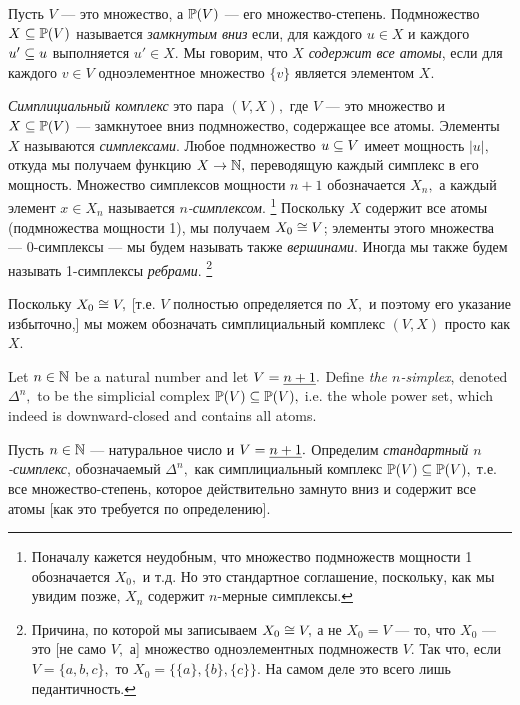 \documentclass[CT4S-EN-RU]{subfiles}
\begin{document}
\begin{definitionRUS}\label{def:simplicial complex}
Пусть $V$ — это множество, а $\PP(V)$ — его множество-степень. Подмножество $X\ss\PP(V)$ называется {\em замкнутым вниз} если, для каждого $u\in X$ и каждого $u'\ss u$ выполняется $u'\in X.$ Мы говорим, что $X$ {\em содержит все атомы}, если для каждого $v\in V$ одноэлементное множество $\{v\}$ является элементом $X.$ 

{\em Симплициальный комплекс} это пара $(V,X),$ где $V$ — это множество и $X\ss\PP(V)$ — замкнутоее вниз подмножество, содержащее все атомы. Элементы $X$ называются {\em симплексами}. Любое подмножество $u\ss V$ имеет мощность $|u|,$ откуда мы получаем функцию $X\to\NN,$ переводящую каждый симплекс в его мощность. Множество симплексов мощности $n+1$ обозначается $X_n,$ а каждый элемент $x\in X_n$ называется {\em $n$-симплексом}.%
\footnote{Поначалу кажется неудобным, что множество подмножеств мощности 1 обозначается $X_0,$ и т.д. Но это стандартное соглашение, поскольку, как мы увидим позже, $X_n$ содержит $n$-мерные симплексы.}
Поскольку $X$ содержит все атомы (подмножества мощности 1), мы получаем $X_0\iso V$; элементы этого множества — 0-симплексы — мы будем называть также {\em вершинами}. Иногда мы также будем называть 1-симплексы {\em ребрами}.%
\footnote{Причина, по которой мы записываем $X_0\iso V,$ а не $X_0=V$ — то, что $X_0$ — это [не само $V,$ а] множество одноэлементных подмножеств $V.$ Так что, если $V=\{a,b,c\},$ то $X_0=\{\{a\},\{b\},\{c\}\}.$ На самом деле это всего лишь педантичность.}

Поскольку $X_0\iso V,$ [т.е. $V$ полностью определяется по $X,$ и поэтому его указание избыточно,] мы можем обозначать симплициальный комплекс $(V,X)$ просто как $X.$
\end{definitionRUS}

\begin{exampleENG}
Let $n\in\NN$ be a natural number and let $V=\ul{n+1}.$ Define {\em the $n$-simplex}, denoted $\Delta^n,$ to be the simplicial complex $\PP(V)\ss\PP(V),$ i.e. the whole power set, which indeed is downward-closed and contains all atoms. 
\end{exampleENG}

\begin{exampleRUS}
Пусть $n\in\NN$ — натуральное число и $V=\ul{n+1}.$ Определим {\em стандартный $n$-симплекс},%
обозначаемый $\Delta^n,$ как симплициальный комплекс $\PP(V)\ss\PP(V),$ т.е. все множество-степень, которое действительно замнуто вниз и содержит все атомы [как это требуется по определению]. 
\end{exampleRUS}
\end{document}
